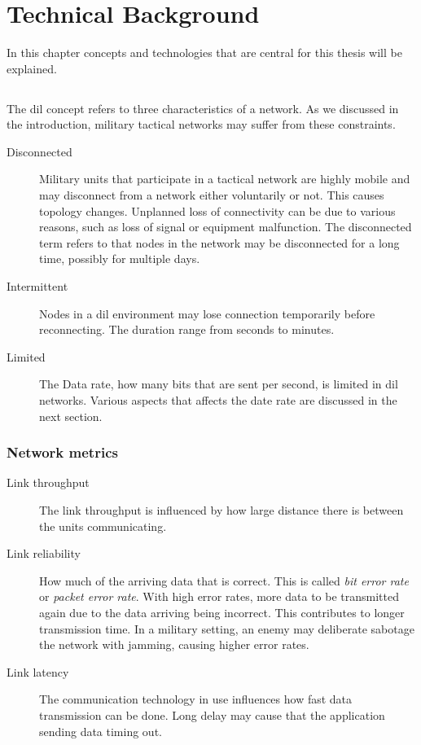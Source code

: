 \chapter{Technical Background}

In this chapter concepts and technologies that are central for this thesis will
be explained.

\section{}
\label{dil}

The \gls{dil} concept refers to three characteristics of a network. As we
discussed in the introduction, military tactical networks may suffer from these
constraints.

\begin{description}
\item[Disconnected]
Military units that participate in a tactical network are highly mobile
and may disconnect from a network either voluntarily or not. This causes
topology changes. Unplanned loss of connectivity can be due to various reasons,
such as loss of signal or equipment malfunction.  The disconnected term refers
to that nodes in the network may be disconnected for a long time, possibly for
multiple days.

\item[Intermittent]

Nodes in a \gls{dil} environment may lose connection temporarily before
reconnecting. The duration range from seconds to minutes.

\item[Limited] The Data rate, how many bits that are sent per second, is limited
in \gls{dil} networks. Various aspects that affects the date rate are discussed
in the next section.

\end{description}

\subsection{Network metrics}
\begin{description}

\item[Link throughput] The link throughput is influenced by how large distance
there is between the units communicating.

\item[Link reliability] How much of the arriving data that is correct. This is
called \textit{bit error rate} or \textit{packet error rate}. With high error
rates, more data to be transmitted again due to the data arriving being
incorrect. This contributes to longer transmission time. In a military setting,
an enemy may deliberate sabotage the network with jamming, causing higher error
rates.

\item[Link latency] The communication technology in use influences how fast data
transmission can be done. Long delay may cause that the application sending data
timing out.

\end{description}

